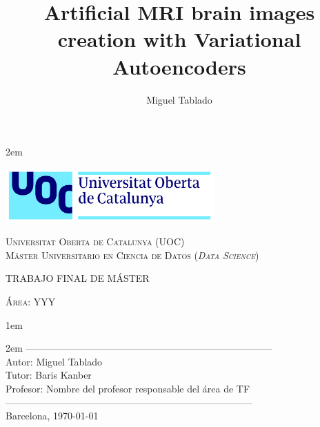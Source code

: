 \newpage
\thispagestyle{empty}

\baselineskip 2em


\centerline{\includegraphics[width=0.6\textwidth]{images/UOC-logo}}
\begin{center}
\textsc{Universitat Oberta de Catalunya (UOC) \\
 Máster Universitario en Ciencia de Datos (\textit{Data Science})\\}


\vspace*{1.5cm}

\textsc{\Large TRABAJO FINAL DE MÁSTER}

\vspace*{0.5cm}

\textsc{\large Área: YYY}



\vspace*{2.0cm}

\title{\Large Artificial MRI brain images creation with Variational Autoencoders}

\vspace{2.5cm}
\baselineskip 1em

\baselineskip 2em
-----------------------------------------------------------------------------\\
Autor:      Miguel Tablado\\
Tutor:      Baris Kanber\\
Profesor:   Nombre del profesor responsable del área de TF\\
-----------------------------------------------------------------------------\\
\vspace*{1.5cm}
Barcelona, \today

\author{Miguel Tablado}

\end{center}
\hfill
